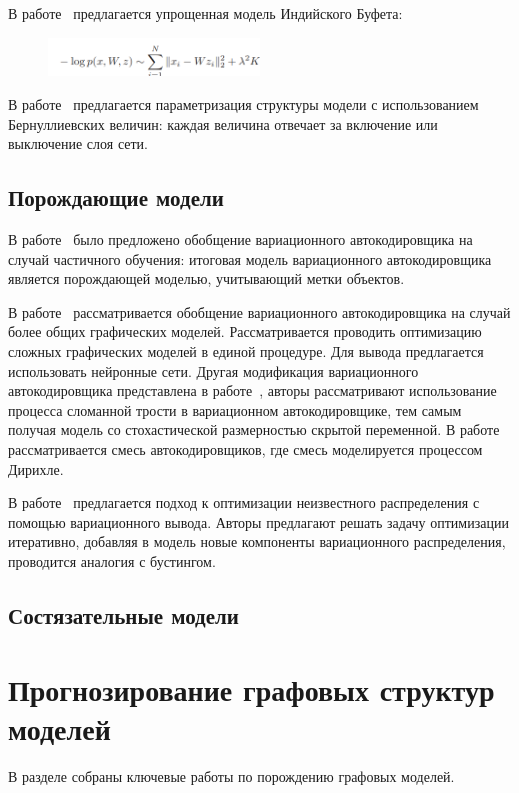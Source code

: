 В работе~\cite{cib_simple} предлагается упрощенная модель Индийского Буфета:
\begin{figure}[H]
\includegraphics[width=0.5\textwidth]{./plots/arch_review_figs/cib_simple.png}
\end{figure}

В работе~\cite{shirakawa2018dynamic} предлагается параметризация структуры модели с использованием Бернуллиевских величин:
каждая величина отвечает за включение или выключение слоя сети.



\subsection*{Порождающие модели}
В работе~\cite{Kingma} было предложено обобщение вариационного автокодировщика на случай частичного обучения: 
итоговая модель вариационного автокодировщика является порождающей моделью, учитывающий метки объектов. 

В работе~\cite{vae_graph} рассматривается обобщение вариационного автокодировщика на случай более общих графических моделей. Рассматривается проводить оптимизацию сложных графических моделей в единой процедуре. Для вывода предлагается использовать нейронные сети.
Другая модификация вариационного автокодировщика представлена в работе~\cite{vae_stick}, авторы рассматривают использование процесса сломанной трости в вариационном автокодировщике, тем самым получая модель со стохастической размерностью скрытой переменной. В работе~\cite{vae_mix} рассматривается смесь автокодировщиков, где смесь моделируется процессом Дирихле.


В работе~\cite{var_boost} предлагается подход к оптимизации неизвестного распределения с помощью вариационного вывода. Авторы предлагают решать задачу оптимизации итеративно, добавляя в модель новые компоненты вариационного распределения, проводится аналогия с бустингом.
\subsection*{Состязательные модели}

\section{Прогнозирование графовых структур моделей}
В разделе собраны ключевые работы по порождению графовых моделей.

